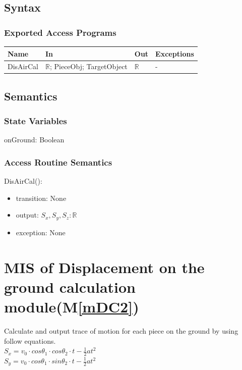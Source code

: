 \documentclass[12pt, titlepage]{article}
\newcommand{\mref}[1]{M\ref{#1}}
\begin{document}
\subsection{Syntax}

\subsubsection{Exported Access Programs}

\begin{center}
	\begin{tabular}{p{2cm} p{4cm} p{4cm} p{2cm}}
		\hline
		\textbf{Name} & \textbf{In} & \textbf{Out} & \textbf{Exceptions} \\
		\hline
		DisAirCal & $\mathbb{R}$; PieceObj; TargetObject & $\mathbb{R}$ & - \\
		\hline
	\end{tabular}
\end{center}

\subsection{Semantics}

\subsubsection{State Variables}

onGround: Boolean 

\subsubsection{Access Routine Semantics}

\noindent DisAirCal():
\begin{itemize}
	\item transition: None
	\item output: $S_{x},S_{y},S_{z}: \mathbb{R}$ 
	\item exception: None
\end{itemize}

\section{MIS of Displacement on the ground calculation module(\mref{mDC2})}
Calculate and output trace of motion for each piece on the ground by using follow equations.\\
$S_{x}=v_{0}\cdot cos\theta _{1}\cdot cos\theta _{2}\cdot t-\frac{1}{2}at^{2}$\\
$S_{y}=v_{0}\cdot cos\theta _{1}\cdot sin\theta _{2}\cdot t-\frac{1}{2}at^{2}$
\end{document}
